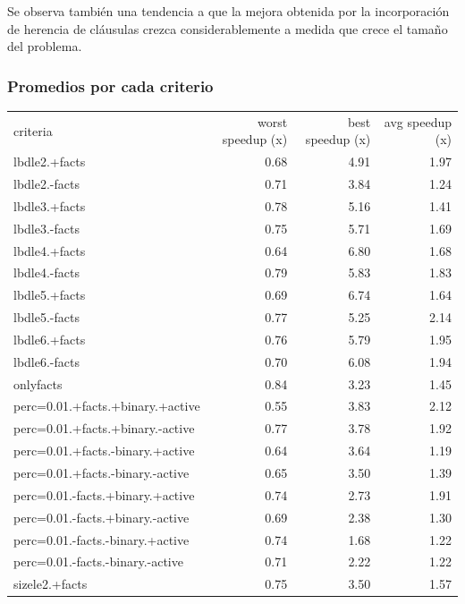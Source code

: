 Se observa también una tendencia a que la mejora obtenida por la incorporación
de herencia de cláusulas crezca considerablemente a medida que crece el tamaño
del problema.

\subsubsection{Promedios por cada criterio}

\hspace{-5em}
\begin{minipage}{\textwidth}
	\small
	\begin{tabular}{lrrr}
		\toprule
		criteria	&	worst speedup (x)	&	best speedup (x)	&	avg speedup (x) \\
		\cmidrule(r){1-4}
		lbdle2.+facts	&	0.68	&	4.91	&	1.97 \\
		lbdle2.-facts	&	0.71	&	3.84	&	1.24 \\
		lbdle3.+facts	&	0.78	&	5.16	&	1.41 \\
		lbdle3.-facts	&	0.75	&	5.71	&	1.69 \\
		lbdle4.+facts	&	0.64	&	6.80	&	1.68 \\
		lbdle4.-facts	&	0.79	&	5.83	&	1.83 \\
		lbdle5.+facts	&	0.69	&	6.74	&	1.64 \\
		lbdle5.-facts	&	0.77	&	5.25	&	2.14 \\
		lbdle6.+facts	&	0.76	&	5.79	&	1.95 \\
		lbdle6.-facts	&	0.70	&	6.08	&	1.94 \\
		\cmidrule(r){1-4}
		onlyfacts	&	\cellcolor{green}0.84	&	3.23	&	1.45 \\
		\cmidrule(r){1-4}
		perc=0.01.+facts.+binary.+active	&	\cellcolor{red}0.55	&	3.83	&	2.12 \\
		perc=0.01.+facts.+binary.-active	&	0.77	&	3.78	&	1.92 \\
		perc=0.01.+facts.-binary.+active	&	0.64	&	3.64	&	\cellcolor{red}1.19 \\
		perc=0.01.+facts.-binary.-active	&	0.65	&	3.50	&	1.39 \\
		perc=0.01.-facts.+binary.+active	&	0.74	&	2.73	&	1.91 \\
		perc=0.01.-facts.+binary.-active	&	0.69	&	2.38	&	1.30 \\
		perc=0.01.-facts.-binary.+active	&	0.74	&	\cellcolor{red}1.68	&	1.22 \\
		perc=0.01.-facts.-binary.-active	&	0.71	&	2.22	&	1.22 \\
		\cmidrule(r){1-4}
		sizele2.+facts	&	0.75	&	3.50	&	1.57 \\

\end{tabular}
\end{minipage}
